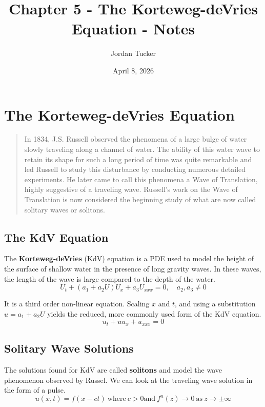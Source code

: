 \documentclass[12pt, letterpaper]{article}
\title{Chapter 5 - The Korteweg-deVries Equation - Notes}
\author{Jordan Tucker}
\date{April 8, 2026}
\begin{document}
    \maketitle
    \section{The Korteweg-deVries Equation}\label{sec:the-korteweg-devries-equation}
    \begin{quotation}
    In 1834, J.S. Russell observed the phenomena of a large bulge of water slowly traveling along a
    channel of water.
    The ability of this water wave to retain its shape for such a long period of time was quite
    remarkable and led Russell to study this disturbance by conducting numerous detailed
    experiments.
    He later came to call this phenomena a Wave of Translation, highly suggestive of a traveling
    wave.
    Russell's work on the Wave of Translation is now considered the beginning study of what are now
    called solitary waves or solitons.
    \end{quotation}

    \subsection{The KdV Equation}
    The \textbf{Korteweg-deVries} (KdV) equation is a PDE used to model the height of the surface of
    shallow water in the presence of long gravity waves.
    In these waves, the length of the wave is large compared to the depth of the water.
    \begin{equation}
        U_t + (a_1 + a_2 U) U_x + a_3 U_{xxx} = 0, \quad a_2,a_3 \neq 0
    \end{equation}

    It is a third order non-linear equation.
    Scaling $x$ and $t$, and using a substitution $u = a_1 + a_2 U$ yields the reduced, more
    commonly used form of the KdV equation.
    \begin{equation}
        u_t + uu_x + u_{xxx} = 0
    \end{equation}

    \subsection{Solitary Wave Solutions}

    The solutions found for KdV are called \textbf{solitons} and model the wave phenomenon observed
    by Russel.
    We can look at the traveling wave solution in the form of a pulse.
    \[
        u(x,t) = f(x-ct) \ \text{where} \ c>0 \text{and} \ f^n(z) \rightarrow 0 \ \text{as}
        \ z \rightarrow \pm \infty
    \]
\end{document}
